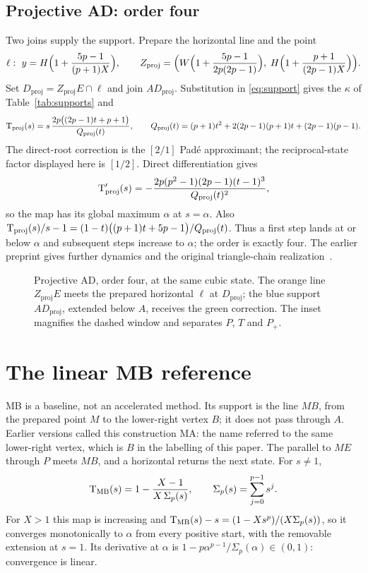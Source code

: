 \subsection{Projective AD: order four}

Two joins supply the support. Prepare the horizontal line and the point
\[ \ell:\ y=H\Bigl(1+\frac{5p-1}{(p+1)X}\Bigr),\qquad
Z_{\mathrm{proj}}=\Bigl(W\Bigl(1+\frac{5p-1}{2p(2p-1)}\Bigr),\;H\Bigl(1+\frac{p+1}{(2p-1)X}\Bigr)\Bigr). \]
Set $D_{\mathrm{proj}}=Z_{\mathrm{proj}}E\cap\ell$ and join $AD_{\mathrm{proj}}$. Substitution in
\eqref{eq:support} gives the $\kappa$ of Table~\ref{tab:supports} and
\begin{equation}\label{eq:proj}
\mathrm{T}_{\mathrm{proj}}(s)=s\,\frac{2p\bigl((2p-1)t+p+1\bigr)}{Q_{\mathrm{proj}}(t)},\qquad
Q_{\mathrm{proj}}(t)=(p+1)t^{2}+2(2p-1)(p+1)t+(2p-1)(p-1).
\end{equation}
The direct-root correction is the $[2/1]$ Pad\'e approximant; the reciprocal-state factor displayed
here is $[1/2]$. Direct differentiation gives
\[ \mathrm{T}_{\mathrm{proj}}'(s)=-\frac{2p(p^{2}-1)(2p-1)(t-1)^{3}}{Q_{\mathrm{proj}}(t)^{2}}, \]
so the map has its global maximum $\alpha$ at $s=\alpha$. Also
$\mathrm{T}_{\mathrm{proj}}(s)/s-1=(1-t)\bigl((p+1)t+5p-1\bigr)/Q_{\mathrm{proj}}(t)$. Thus a first step lands
at or below $\alpha$ and subsequent steps increase to $\alpha$; the order is exactly four. The
earlier preprint gives further dynamics and the original triangle-chain realization~\cite{v20}.

\begin{figure}[htbp]
\centering\figProjective
\caption{Projective AD, order four, at the same cubic state. The orange line $Z_{\mathrm{proj}}E$ meets
the prepared horizontal $\ell$ at $D_{\mathrm{proj}}$; the blue support $AD_{\mathrm{proj}}$, extended
below $A$, receives the green correction. The inset magnifies the dashed window and separates $P$, $T$
and $P_+$.}\label{fig:proj}
\end{figure}

\FloatBarrier
\section{The linear MB reference}\label{app:mb}

MB is a baseline, not an accelerated method. Its support is the line $MB$, from the prepared point $M$
to the lower-right vertex $B$; it does not pass through $A$. Earlier versions called this construction
MA: the name referred to the same lower-right vertex, which is $B$ in the labelling of this paper. The
parallel to $ME$ through $P$ meets $MB$, and a horizontal returns the next state. For $s\neq1$,
\[ \mathrm{T}_{\mathrm{MB}}(s)=1-\frac{X-1}{X\,\Sigma_p(s)},\qquad \Sigma_p(s)=\sum_{j=0}^{p-1}s^{j}. \]
For $X>1$ this map is increasing and
$\mathrm{T}_{\mathrm{MB}}(s)-s=(1-Xs^{p})/(X\Sigma_p(s))$, so it converges monotonically to $\alpha$ from every
positive start, with the removable extension at $s=1$. Its derivative at $\alpha$ is
$1-p\alpha^{p-1}/\Sigma_p(\alpha)\in(0,1)$: convergence is linear.

